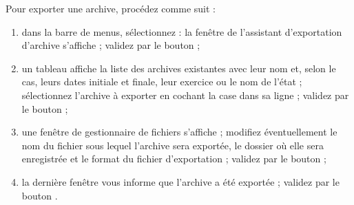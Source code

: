 Pour exporter une archive, procédez comme suit :

\begin{enumerate}
	\item dans la barre de menus, sélectionnez  : la fenêtre de l'assistant d'exportation d'archive s'affiche ; validez par le bouton  ;
	\item un tableau affiche la liste des archives existantes avec leur nom et, selon le cas, leurs dates initiale et finale, leur exercice ou le nom de l'état ; sélectionnez l'archive à exporter en cochant la case dans sa ligne ; validez par le bouton  ;
	\item une fenêtre de gestionnaire de fichiers s'affiche ; modifiez éventuellement le nom du fichier sous lequel l'archive sera exportée, le dossier où elle sera enregistrée et le format du fichier d'exportation ; validez par le bouton  ;
	\item la dernière fenêtre vous informe que l'archive a été exportée ; validez par le bouton .
\end{enumerate}









